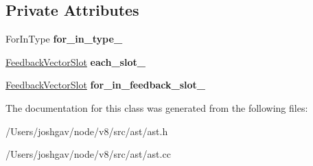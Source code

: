 \subsection*{Private Attributes}
\begin{DoxyCompactItemize}
\item 
For\+In\+Type {\bfseries for\+\_\+in\+\_\+type\+\_\+}\hypertarget{classv8_1_1internal_1_1_for_in_statement_ab905e0e55aee6bd7fb10771c634e9753}{}\label{classv8_1_1internal_1_1_for_in_statement_ab905e0e55aee6bd7fb10771c634e9753}

\item 
\hyperlink{classv8_1_1internal_1_1_feedback_vector_slot}{Feedback\+Vector\+Slot} {\bfseries each\+\_\+slot\+\_\+}\hypertarget{classv8_1_1internal_1_1_for_in_statement_aa7b674a1c5f5ebbdb16eb13aa42908a5}{}\label{classv8_1_1internal_1_1_for_in_statement_aa7b674a1c5f5ebbdb16eb13aa42908a5}

\item 
\hyperlink{classv8_1_1internal_1_1_feedback_vector_slot}{Feedback\+Vector\+Slot} {\bfseries for\+\_\+in\+\_\+feedback\+\_\+slot\+\_\+}\hypertarget{classv8_1_1internal_1_1_for_in_statement_ae201d3f40a3e092f8e8232a063bd6d77}{}\label{classv8_1_1internal_1_1_for_in_statement_ae201d3f40a3e092f8e8232a063bd6d77}

\end{DoxyCompactItemize}


The documentation for this class was generated from the following files\+:\begin{DoxyCompactItemize}
\item 
/\+Users/joshgav/node/v8/src/ast/ast.\+h\item 
/\+Users/joshgav/node/v8/src/ast/ast.\+cc\end{DoxyCompactItemize}
